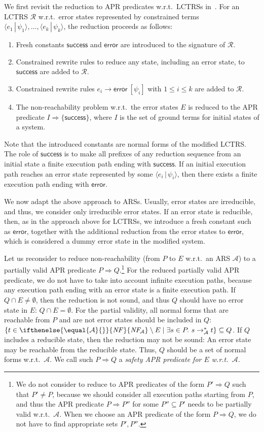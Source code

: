 \documentclass[10pt,a4paper]{article}
\def\cA{\mathcal{A}}
\def\cR{\mathcal{R}}
\newcommand{\symb}[1]{\mathsf{#1}}
\newcommand{\Constraint}[1]{[ #1 ]}
\newcommand{\CTerm}[2]{\langle #1 \,|\, #2 \rangle}
\newcommand{\NF}[1][]{\ifthenelse{\equal{#1}{}}{\mathit{NF}}{\mathit{NF\!}_{#1}}}
\newcommand{\ReachPred}[2]{#1 \Rightarrow #2}
\begin{document}
We first revisit the reduction to APR predicates w.r.t.\ LCTRSs in~\cite{KN24jip}.
For an LCTRS $\cR$ w.r.t.\ error states represented by constrained terms $\CTerm{e_1}{\psi_1},\ldots,\CTerm{e_k}{\psi_k}$,
the reduction proceeds as follows:
\begin{enumerate}
	\item
	      Fresh constants $\symb{success}$ and $\symb{error}$ are introduced to the signature of $\cR$.
	\item
	      Constrained rewrite rules to reduce any state, including an error state, to $\symb{success}$ are added to $\cR$.
	\item
	      Constrained rewrite rules $e_i \to \symb{error} ~ \Constraint{\psi_i}$ with $1 \leq i \leq k$ are added to $\cR$.
	\item
	      The non-reachability problem w.r.t.\ the error states $E$ is reduced to
	      the APR predicate $\ReachPred{I}{\{\symb{success}\}}$, where $I$ is the set of ground terms for initial states of a system. \end{enumerate}
Note that the introduced constants are normal forms of the modified LCTRS.
The role of $\symb{success}$ is to make all prefixes of any reduction sequence from an initial state a finite execution path ending with $\symb{success}$.
If an initial execution path reaches an error state represented by some $\CTerm{e_i}{\psi_i}$, then there exists a finite execution path ending with $\symb{error}$.


We now adapt the above approach to ARSs.
Usually, error states are irreducible, and thus, we consider only irreducible error states.
If an error state is reducible, then, as in the approach above for LCTRSs, we introduce a fresh constant such as $\symb{error}$, together with the additional reduction from the error states to $\symb{error}$, which is considered a dummy error state in the modified system.

Let us reconsider to reduce non-reachability (from $P$ to $E$ w.r.t.\ an ARS $\cA$) to a partially valid APR predicate $\ReachPred{P}{Q}$.\footnote{We do not consider to reduce to APR predicates of the form $\ReachPred{P'}{Q}$ such that $P' \ne P$, because we should consider all execution paths starting from $P$, and thus the APR predicate $\ReachPred{P}{P''}$ for some $P'' \subseteq P'$ needs to be partially valid w.r.t.\ $\cA$.
	When we choose an APR predicate of the form $\ReachPred{P}{Q}$, we do not have to find appropriate sets $P',P''$.}
For the reduced partially valid APR predicate, we do not have to take into account infinite execution paths, because any execution path ending with an error state is a finite execution path.
If $Q \cap E \ne \emptyset$, then the reduction is not sound, and thus $Q$ should have no error state in $E$: $Q \cap E = \emptyset$.
For the partial validity, all normal forms that are reachable from $P$ and are not error states should be included in $Q$:
$\{ t \in \NF[\cA] \setminus E \mid \exists s \in P.\ s \to_\cA^* t \} \subseteq Q$.
If $Q$ includes a reducible state, then the reduction may not be sound:
An error state may be reachable from the reducible state.
Thus, $Q$ should be a set of normal forms w.r.t.\ $\cA$.
We call such $\ReachPred{P}{Q}$ a \emph{safety APR predicate for $E$ w.r.t.\ $\cA$}.
\end{document}
